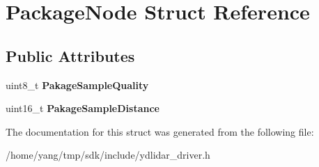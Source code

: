 \hypertarget{struct_package_node}{}\section{Package\+Node Struct Reference}
\label{struct_package_node}
\subsection*{Public Attributes}
\begin{DoxyCompactItemize}
\item 
uint8\+\_\+t {\bfseries Pakage\+Sample\+Quality}\hypertarget{struct_package_node_aa93fa6630d9886ae0e381e06a72884cf}{}\label{struct_package_node_aa93fa6630d9886ae0e381e06a72884cf}

\item 
uint16\+\_\+t {\bfseries Pakage\+Sample\+Distance}\hypertarget{struct_package_node_a1ce84783c40c6f026a1b2dad2347d7a7}{}\label{struct_package_node_a1ce84783c40c6f026a1b2dad2347d7a7}

\end{DoxyCompactItemize}


The documentation for this struct was generated from the following file\+:\begin{DoxyCompactItemize}
\item 
/home/yang/tmp/sdk/include/ydlidar\+\_\+driver.\+h\end{DoxyCompactItemize}
